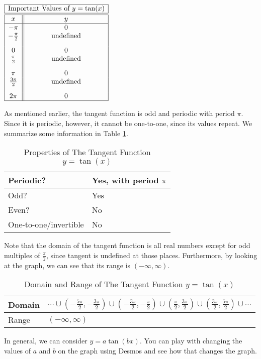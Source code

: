 \documentclass[nooutcomes]{ximera}
\begin{document}
\begin{center}
\(
\begin{array}{ |c || c|  }
 \hline
 \multicolumn{2}{|c|}{\text{\normalfont Important Values of } y=\tan(x)} \\
\hline
 \hline
 x & y\\
 \hline

 -\pi&0\\

 -\frac{\pi}{2}& \text{undefined}\\[2ex]

 0&0\\

 \frac{\pi}{2}&\text{undefined}\\[2ex]

 \pi&0\\

\frac{3\pi}{2}&\text{undefined}\\[2ex]

 2 \pi&0\\
\hline
\end{array}
\)
\end{center} 

As mentioned earlier, the tangent function is odd and periodic with period $\pi$. Since it is periodic, however, it cannot be one-to-one, since its values repeat. We summarize some information in Table \ref{tab:tangentproperties}.

\begin{table}[h]
\caption{\label{tab:tangentproperties}Properties of The Tangent Function $y = \tan(x)$}
\centering
\begin{tabular}{l|l}
Periodic? & Yes, with period $\pi$ \\ \hline
Odd? &  Yes \\ \hline
Even? & No \\ \hline
One-to-one/invertible & No
\end{tabular}
\end{table}

Note that the domain of the tangent function is all real numbers except for odd multiples of $\frac{\pi}{2}$, since tangent is undefined at those places. Furthermore, by looking at the graph, we can see that its range is $(-\infty, \infty)$.

\begin{table}[h]
\caption{\label{tab:tangentdr}Domain and Range of The Tangent Function $y = \tan(x)$}
\centering
\begin{tabular}{l|l}
Domain & $\cdots \cup \left(-\frac{5\pi}{2}, -\frac{3\pi}{2}\right) \cup \left(-\frac{3\pi}{2}, -\frac{\pi}{2}\right) \cup \left(\frac{\pi}{2}, \frac{3\pi}{2}\right) \cup \left(\frac{3\pi}{2}, \frac{5\pi}{2}\right) \cup \cdots$ \\ \hline
Range & $(-\infty, \infty)$
\end{tabular}
\end{table}

In general, we can consider $y=a\tan(bx)$.  You can play with changing the values of $a$ and $b$ on the graph using Desmos and see how that changes the graph.  

\begin{center}  
\end{center}
\end{document}
